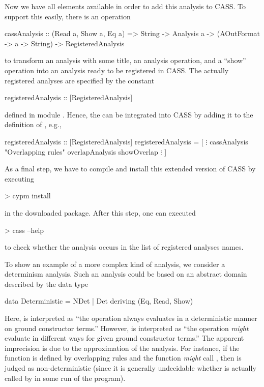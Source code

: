 Now we have all elements available in order to add this analysis to CASS.
To support this easily, there is an operation
%
\begin{curry}
cassAnalysis :: (Read a, Show a, Eq a)
             => String -> Analysis a -> (AOutFormat -> a -> String)
             -> RegisteredAnalysis
\end{curry}
%
to transform an analysis with some title, an analysis operation,
and a ``show'' operation into an analysis ready to be registered in CASS.
The actually registered analyses are specified by the constant
%
\begin{curry}
registeredAnalysis :: [RegisteredAnalysis]
\end{curry}
%
defined in module .
Hence, the  can be integrated into CASS
by adding it to the definition of , e.g.,
%
\begin{curry}
registeredAnalysis :: [RegisteredAnalysis]
registeredAnalysis =
  [
  $\vdots$
  cassAnalysis "Overlapping rules" overlapAnalysis showOverlap
  $\vdots$
  ]
\end{curry}
%
As a final step, we have to compile and install this extended
version of CASS by executing
\begin{curry}
> cypm install
\end{curry}
in the downloaded package. After this step, one can executed
\begin{curry}
> cass --help
\end{curry}
to check whether the  analysis occurs in the list
of registered analyses names.

To show an example of a more complex kind of analysis, we consider
a determinism analysis.
Such an analysis could be based
on an abstract domain described by the data type
%
\begin{curry}
data Deterministic = NDet | Det
  deriving (Eq, Read, Show)
\end{curry}
%
Here,  is interpreted as ``the operation always evaluates
in a deterministic manner on ground constructor terms.''
However,  is interpreted as ``the operation \emph{might}
evaluate in different ways for given ground constructor terms.''
The apparent imprecision is due to the approximation of the analysis.
For instance, if the function  is defined by overlapping rules
and the function  \emph{might} call , then 
is judged as non-deterministic (since it is generally undecidable
whether  is actually called by  in some run of the
program).

